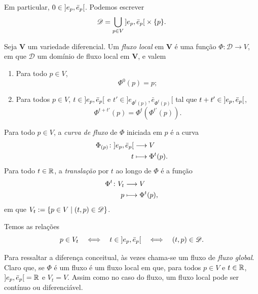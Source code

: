 Em particular, $0 \in \left]{e_p},{\bar e_p}\right[$. Podemos escrever
	\begin{equation*}
	\mathscr{D} = \bigcup_{p \in V} \left]{e_p},{\bar e_p}\right[ \times \{p\}.
	\end{equation*}

\begin{definition}
Seja $\bm V$ um variedade diferencial. Um \emph{fluxo local} em $\bm V$ é uma função $\Phi\colon \mathscr{D} \to V$, em que $\mathscr{D}$ um domínio de fluxo local em $\bm V$, e valem
	\begin{enumerate}
	\item Para todo $p \in V$,
		\begin{equation*}
		\Phi^0(p) = p;
		\end{equation*}
	\item Para todos $p \in V$, $t \in \left]{e_p},{\bar e_p}\right[$ e $t' \in \left.] e_{\Phi^t(p)} , \bar e_{\Phi^t(p)} [\right.$ tal que $t+t' \in \left]{e_p},{\bar e_p}\right[$,
		\begin{equation*}
		\Phi^{t+t'}(p) = \Phi^t(\Phi^{t'}(p)).
		\end{equation*}
	\end{enumerate}

Para todo $p \in V$, a \emph{curva de fluxo} de $\Phi$ iniciada em $p$ é a curva
	\begin{align*}
	{\Phi_{(p)}}\colon {\left]{e_p},{\bar e_p}\right[} &\longrightarrow {V} \\{t} &\longmapsto \Phi^t(p).
	\end{align*}
Para todo $t \in \mathbb{R}$, a \emph{translação} por $t$ ao longo de $\Phi$ é a função
	\begin{align*}
	{\Phi^t}\colon {V_t} &\longrightarrow {V} \\{p} &\longmapsto \Phi^t(p),
	\end{align*}
em que $V_t := \left\{{p \in V}\;\middle\vert\;{(t,p) \in \mathscr{D}}\right\}$.	
\end{definition}

Temos as relações
	\begin{equation*}
	p \in V_t \quad \Longleftrightarrow \quad t \in \left]{e_p},{\bar e_p}\right[ \quad \Longleftrightarrow \quad (t,p) \in \mathscr{D}.
	\end{equation*}

Para ressaltar a diferença conceitual, às vezes chama-se um fluxo de \textit{fluxo global}. Claro que, se $\Phi$ é um fluxo é um fluxo local em que, para todos $p \in V$ e $t \in \mathbb{R}$, $\left]{e_p},{\bar e_p}\right[ = \mathbb{R}$ e $V_t=V$. Assim como no caso do fluxo, um fluxo local pode ser contínuo ou diferenciável. 

